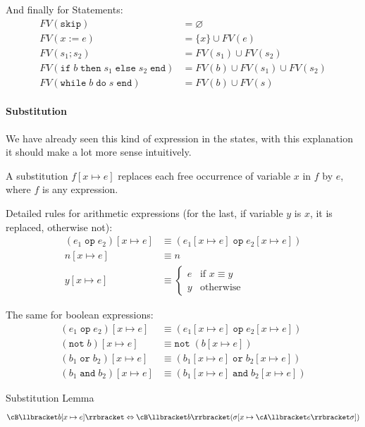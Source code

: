 And finally for Statements:
\begin{align*}
    FV(\texttt{skip})                                                                  & = \varnothing                     \\
    FV(x := e)                                                                         & = \{ x \} \cup FV(e)              \\
    FV(s_1; s_2)                                                                       & = FV(s_1) \cup FV(s_2)            \\
    FV(\texttt{if}\; b\; \texttt{then} \; s_1 \; \texttt{else} \; s_2 \; \texttt{end}) & = FV(b) \cup FV(s_1) \cup FV(s_2) \\
    FV(\texttt{while}\; b\; \texttt{do} \; s \; \texttt{end})                          & = FV(b) \cup FV(s)
\end{align*}


\paragraph{Substitution}
{\scriptsize We have already seen this kind of expression in the states, with this explanation it should make a lot more sense intuitively.}

A substitution $f[x \mapsto e]$ replaces each free occurrence of variable $x$ in $f$ by $e$, where $f$ is any expression.

Detailed rules for arithmetic expressions (for the last, if variable $y$ is $x$, it is replaced, otherwise not):
\begin{align*}
    (e_1 \; \texttt{op} \; e_2)[x \mapsto e] & \equiv (e_1[x \mapsto e] \; \texttt{op} \; e_2[x \mapsto e]) \\
    n[x \mapsto e]                           & \equiv n                                                     \\
    y[x \mapsto e]                           & \equiv \begin{cases}
                                                          e & \text{if } x \equiv y \\
                                                          y & \text{otherwise}
                                                      \end{cases}
\end{align*}

The same for boolean expressions:
\begin{align*}
    (e_1 \; \texttt{op} \; e_2)[x \mapsto e]  & \equiv (e_1[x \mapsto e] \; \texttt{op} \; e_2[x \mapsto e])  \\
    (\texttt{not} \; b)[x \mapsto e]          & \equiv \texttt{not} \; (b[x \mapsto e])                       \\
    (b_1 \; \texttt{or} \; b_2)[x \mapsto e]  & \equiv (b_1[x \mapsto e] \; \texttt{or} \; b_2[x \mapsto e])  \\
    (b_1 \; \texttt{and} \; b_2)[x \mapsto e] & \equiv (b_1[x \mapsto e] \; \texttt{and} \; b_2[x \mapsto e])
\end{align*}

\begin{lemma}[]{Substitution Lemma}
    \[
        \cB\llbracket b[x \mapsto e] \rrbracket \Leftrightarrow \cB\llbracket b \rrbracket (\sigma[x \mapsto \cA\llbracket e \rrbracket \sigma])
    \]
\end{lemma}
